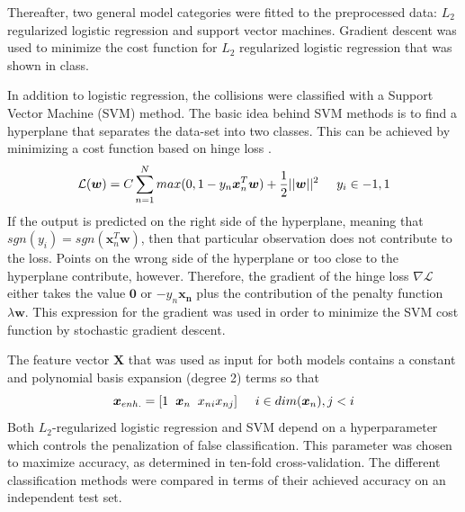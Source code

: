 \documentclass[10pt,conference,compsocconf]{IEEEtran}
\begin{document}
\par
Thereafter, two general model categories were fitted to the preprocessed data: $L_2$ regularized logistic regression and support vector machines. Gradient descent was used to minimize the cost function for $L_2$ regularized logistic regression that was shown in class.
\par
In addition to logistic regression, the collisions were classified with a Support Vector Machine (SVM) method. The basic idea behind SVM methods is to find a hyperplane that separates the data-set into two classes. This can be achieved by minimizing a cost function based on hinge loss \cite{SVM_ref}.
\begin{equation}
\mathcal{L}(\boldsymbol{w}) = C \sum_{n=1}^N max(0,1-y_n \boldsymbol{x}_n^T\boldsymbol{w}) + \frac{1}{2}||\boldsymbol{w}||^2 \hspace{5mm} y_i \in {-1,1}
\end{equation}  
If the output is predicted on the right side of the hyperplane, meaning that $sgn(y_i) = sgn(\boldsymbol{x}_n^T\boldsymbol{w})$, then that particular observation does not contribute to the loss. Points on the wrong side of the hyperplane or too close to the hyperplane contribute, however. Therefore, the gradient of the hinge loss $\nabla \mathcal{L}$ either takes the value $\boldsymbol{0}$ or $-y_n\boldsymbol{x_n}$ plus the contribution of the penalty function $\lambda \boldsymbol{w}$. This expression for the gradient was used in order to minimize the SVM cost function by stochastic gradient descent.
\par
The feature vector $\boldsymbol{X}$ that was used as input for both models contains a constant and polynomial basis expansion (degree 2) terms so that
\begin{equation}
\boldsymbol{x}_{enh.} = [1 \hspace{2mm} \boldsymbol{x}_n \hspace{2mm} x_{ni} x_{nj}] \hspace{5mm} i \in dim(\boldsymbol{x}_n), j < i
\end{equation}
Both $L_2$-regularized logistic regression and SVM depend on a hyperparameter which controls the penalization of false classification. This parameter was chosen to maximize accuracy, as determined in ten-fold cross-validation. The different classification methods were compared in terms of their achieved accuracy on an independent test set. 
\end{document}
